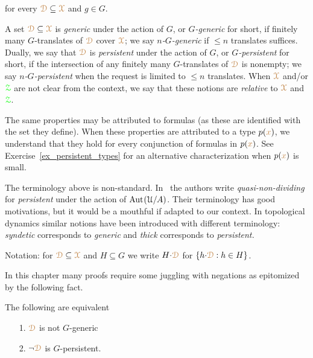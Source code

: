 \hfill for every ${\color{brown}\EuScript D}\subseteq{\color{brown}\EuScript X}$ and $g\in G$.


A set ${\color{brown}\EuScript D}\subseteq{\color{brown}\EuScript X}$ is \emph{generic\/} under the action of $G$, or \emph{$G$-generic\/} for short, if finitely many $G$-translates of ${\color{brown}\EuScript D}$ cover ${\color{brown}\EuScript X}$; we say \emph{$n$-$G$-generic\/} if $\le n$ translates suffices.
Dually, we say that ${\color{brown}\EuScript D}$ is \emph{persistent\/} under the action of $G$, or \emph{$G$-persistent\/} for short, if the intersection of any finitely many $G$-translates of ${\color{brown}\EuScript D}$ is nonempty; we say \emph{$n$-$G$-persistent\/} when the request is limited to $\le n$ translates.
When ${\color{brown}\EuScript X}$ and/or ${\color{green}\EuScript Z}$ are not clear from the context, we say that these notions are \emph{relative\/} to ${\color{brown}\EuScript X}$ and ${\color{green}\EuScript Z}$.

The same properties may be attributed to formulas (as these are identified with the set they define).
When these properties are attributed to a type $p({\color{brown} x})$, we understand that they hold for every conjunction of formulas in $p({\color{brown} x})$.
See Exercise~\ref{ex_persistent_types} for an alternative characterization when $p({\color{brown} x})$ is small.

\noindent\llap{\textcolor{red}{\Large\warning}\kern1.5ex}\ignorespaces
The terminology above is non-standard.
In~\cite{CK} the authors write \textit{quasi-non-dividing\/} for \textit{persistent\/} under the action of ${\rm Aut\kern.15ex}(\EuScript U/A)$.
Their terminology has good motivations, but it would be a mouthful if adapted to our context.
In topological dynamics similar notions have been introduced with different terminology: \textit{syndetic\/} corresponds to \textit{generic\/} and \textit{thick\/} corresponds to \textit{persistent.}

Notation: for ${\color{brown}\EuScript D}\subseteq{\color{brown}\EuScript X}$ and $H\subseteq G$ we write \emph{$H{\cdot}{\color{brown}\EuScript D}$\/} for $\{h{\cdot}{\color{brown}\EuScript D}: h\in H\}$.

In this chapter many proofs require some juggling with negations as epitomized by the following fact.

\begin{fact}\label{fact_fip}
  The following are equivalent
  \begin{itemize}
    \item[1.] ${\color{brown}\EuScript D}$ is not $G$-generic
    \item[2.] $\neg{\color{brown}\EuScript D}$ is $G$-persistent.
  \end{itemize}
\end{fact}

